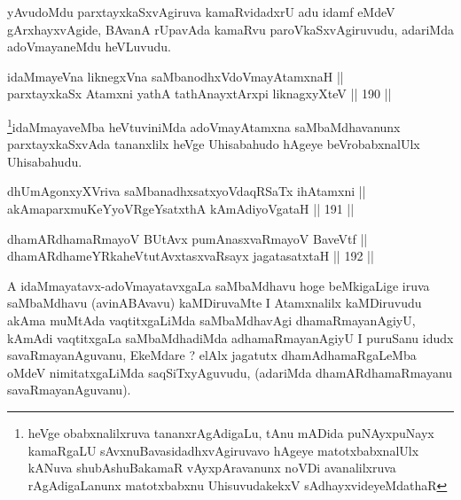 \begin{artha}
yAvudoMdu parxtayxkaSxvAgiruva kamaRvidadxrU adu idamf eMdeV
gArxhayxvAgide, BAvanA rUpavAda kamaRvu paroVkaSxvAgiruvudu, adariMda
adoVmayaneMdu heVLuvudu.
\end{artha}

\begin{shl}
idaMmayeVna liknegxVna saMbanodhxV\s doVmayAtamxnaH || \\
parxtayxkaSx Atamxni yathA tathA\s nayxtArxpi liknagxyXteV \hfill || 190 ||  
\end{shl}

\begin{artha}
\footnote{heVge obabxnalilxruva tananxrAgAdigaLu, tAnu mADida
puNAyxpuNayx kamaRgaLU sAvxnuBavasidadhxvAgiruvavo hAgeye
matotxbabxnalUlx kANuva shubAshuBakamaR vAyxpAravanunx noVDi
avanalilxruva rAgAdigaLanunx matotxbabxnu UhisuvudakekxV sAdhayxvideyeMdathaR}idaMmayaveMba heVtuviniMda adoVmayAtamxna saMbaMdhavanunx parxtayxkaSxvAda tananxlilx heVge Uhisabahudo hAgeye beVrobabxnalUlx Uhisabahudu.
\end{artha}


\begin{shl}
dhUmAgonxyXVriva saMbanadhxsatxyoVdaqRSaTx ihA\s \s tamxni || \\
\footnotemark[1]akAmaparxmuKeYyoVRgeYsatxthA kAmAdiyoVgataH \hfill || 191 || 
\end{shl}

\begin{shl}
dhamARdhamaRmayoV BUtAvx pumAnasxvaRmayoV BaveVtf || \\
dhamARdhameYRkaheVtutAvxtasxvaRsayx jagatasatxtaH \hfill || 192 ||  
\end{shl}

\begin{artha}
A idaMmayatavx-adoVmayatavxgaLa saMbaMdhavu hoge
beMkigaLige iruva saMbaMdhavu (avinABAvavu) kaMDiruvaMte I Atamxnalilx
kaMDiruvudu akAma muMtAda vaqtitxgaLiMda  saMbaMdhavAgi
dhamaRmayanAgiyU, kAmAdi vaqtitxgaLa saMbaMdhadiMda adhamaRmayanAgiyU
I puruSanu idudx savaRmayanAguvanu, EkeMdare ? elAlx jagatutx
dhamAdhamaRgaLeMba oMdeV nimitatxgaLiMda saqSiTxyAguvudu, (adariMda
dhamARdhamaRmayanu savaRmayanAguvanu).
\end{artha}


